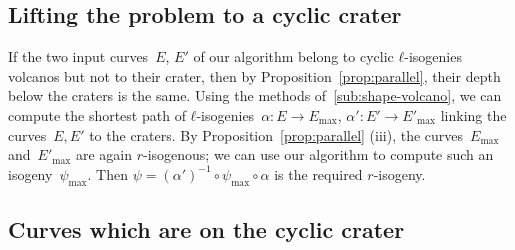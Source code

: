 \documentclass{lms}
\begin{document}
\subsection{Lifting the problem to a cyclic crater}

If the two input curves~$E$, $E'$ of our algorithm
belong to cyclic $ℓ$-isogenies volcanos but not to their crater,
then by Proposition~\ref{prop:parallel},
their depth below the craters is the same.
Using the methods of~\ref{sub:shape-volcano},
we can compute the shortest path of $ℓ$-isogenies~$α: E → E_{\max}$,
$α': E' → E'_{\max}$ linking the curves~$E, E'$ to the craters.
By Proposition~\ref{prop:parallel} (iii),
the curves~$E_{\max}$ and~$E'_{\max}$ are again $r$-isogenous;
we can use our algorithm to compute such an isogeny~$ψ_{\max}$.
Then $ψ = (α')^{-1} ∘ ψ_{\max} ∘ α$ is the required $r$-isogeny.

 \subsection{Curves which are on the cyclic crater}
\end{document}
